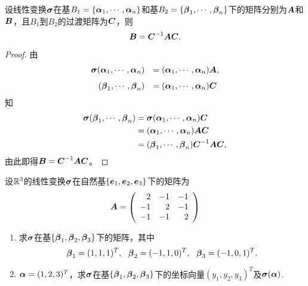 \begin{frame}
  \begin{dingli}
    设线性变换$\sigmabd$在基$B_1=\{\alphabd_1,\cd,\alphabd_n\}$和基$B_2=\{\betabd_1,\cd,\betabd_n\}$下的矩阵分别为$\MA$和$\MB$，且$B_1$到$B_2$的过渡矩阵为$\MC$，则
    $$
    \MB = \MC^{-1}\MA\MC.
    $$
  \end{dingli}\vspace{.1in}\pause 
  \begin{proof}
    由
    $$
    \begin{array}{rl}
      \sigmabd(\alphabd_1,\cd,\alphabd_n)&=(\alphabd_1,\cd,\alphabd_n)\MA, \\[.1in]
      (\betabd_1,\cd,\betabd_n)&=(\alphabd_1,\cd,\alphabd_n)\MC
    \end{array}
    $$
    知
    $$
    \begin{aligned}
      \sigmabd(\betabd_1,\cd,\betabd_n)&=\sigmabd(\alphabd_1,\cd,\alphabd_n)\MC\\
      &=(\alphabd_1,\cd,\alphabd_n)\MA\MC\\
      &=(\betabd_1,\cd,\betabd_n)\MC^{-1}\MA\MC,
    \end{aligned}
    $$
    由此即得$\MB=\MC^{-1}\MA\MC$。
  \end{proof}
\end{frame}


\begin{frame}
  \begin{li}
    设$\R^3$的线性变换$\sigmabd$在自然基$\{\ve_1,\ve_2,\ve_3\}$下的矩阵为
    $$
    \MA=\left(
      \begin{array}{rrr}
        2&-1&-1\\
        -1&2&-1\\
        -1&-1&2
      \end{array}
    \right)
    $$
    \begin{enumerate}
    \item 求$\sigmabd$在基$\{\betabd_1,\betabd_2,\betabd_3\}$下的矩阵，其中
      $$
      \betabd_1=(1,1,1)^T, ~~\betabd_2=(-1,1,0)^T, ~~\betabd_3=(-1,0,1)^T.
      $$
    \item $\alphabd=(1,2,3)^T$，求$\sigmabd$在基$\{\betabd_1,\betabd_2,\betabd_3\}$下的坐标向量$(y_1,y_2,y_3)^T$及$\sigmabd(\alphabd)$.
    \end{enumerate}
  \end{li}
\end{frame}


